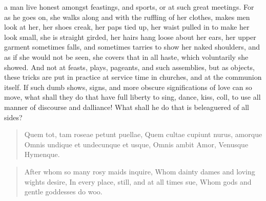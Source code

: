 a man live honest amongst feastings, and sports, or at such great
meetings. For as he goes on, she walks along and with the
ruffling of her clothes, makes men look at her, her shoes creak, her
paps tied up, her waist pulled in to make her look small, she is
straight girded, her hairs hang loose about her ears, her upper garment
sometimes falls, and sometimes tarries to show her naked shoulders, and
as if she would not be seen, she covers that in all haste, which
voluntarily she showed. And not at feasts, plays, pageants, and such
assemblies, but as \Chrysostom objects, these tricks are put in
practice at service time in churches, and at the communion itself. If
such dumb shows, signs, and more obscure significations of love can so
move, what shall they do that have full liberty to sing, dance, kiss,
coll, to use all manner of discourse and dalliance! What shall he do
that is beleaguered of all sides?

\begin{latin}
\begin{verse}%
Quem tot, tam roseae petunt puellae,
Quem cultae cupiunt nurus, amorque
Omnis undique et undecunque et usque,
Omnis ambit Amor, Venusque Hymenque.
\end{verse}%
\end{latin}
\translationrule%
\begin{verse}%
After whom so many rosy maids inquire,
Whom dainty dames and loving wights desire,
In every place, still, and at all times sue,
Whom gods and gentle goddesses do woo.
\end{verse}%

